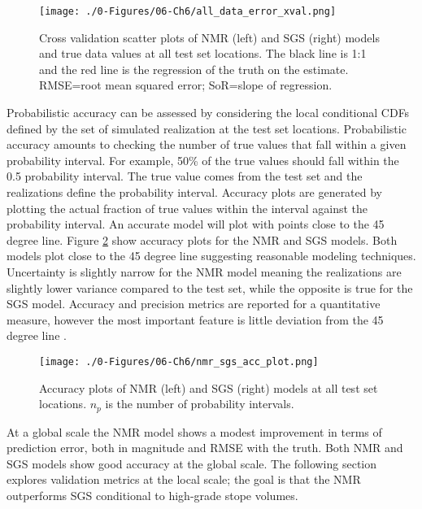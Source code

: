\begin{figure}[htb!]
    \centering
    \texttt{[image: ./0-Figures/06-Ch6/all\_data\_error\_xval.png]}
    \caption{Cross validation scatter plots of  \gls{NMR} (left) and \gls{SGS} (right) models and true data values at all test set locations. The black line is 1:1 and the red line is the regression of the truth on the estimate. RMSE=root mean squared error; SoR=slope of regression.}
    \label{fig:all_data_error_xval}
\end{figure}

Probabilistic accuracy can be assessed by considering the local conditional \glspl{CDF} defined by the set of simulated realization at the test set locations. Probabilistic accuracy amounts to checking the number of true values that fall within a given probability interval. For example, 50\% of the true values should fall within the 0.5 probability interval. The true value comes from the test set and the realizations define the probability interval. Accuracy plots are generated by plotting the actual fraction of true values within the interval against the probability interval. An accurate model will plot with points close to the 45 degree line. Figure \ref{fig:nmr_sgs_acc_plot} show accuracy plots for the \gls{NMR} and \gls{SGS} models. Both models plot close to the 45 degree line suggesting reasonable modeling techniques. Uncertainty is slightly narrow for the \gls{NMR} model meaning the realizations are slightly lower variance compared to the test set, while the opposite is true for the \gls{SGS} model. Accuracy and precision metrics are reported for a quantitative measure, however the most important feature is little deviation from the 45 degree line \citep{deutsch2010display}.

\begin{figure}[htb!]
    \centering
    \texttt{[image: ./0-Figures/06-Ch6/nmr\_sgs\_acc\_plot.png]}
    \caption{Accuracy plots of  \gls{NMR} (left) and \gls{SGS} (right) models at all test set locations. $n_{p}$ is the number of probability intervals. }
    \label{fig:nmr_sgs_acc_plot}
\end{figure}

At a global scale the \gls{NMR} model shows a modest improvement in terms of prediction error, both in magnitude and \gls{RMSE} with the truth. Both \gls{NMR} and \gls{SGS} models show good accuracy at the global scale. The following section explores validation metrics at the local scale; the goal is that the \gls{NMR} outperforms \gls{SGS} conditional to high-grade stope volumes.

